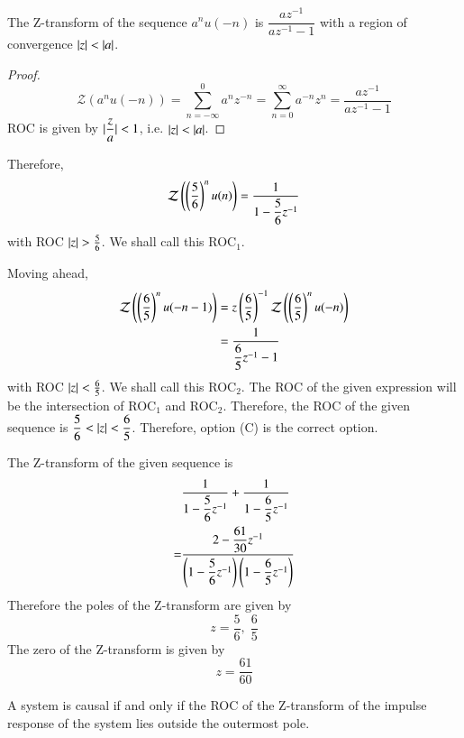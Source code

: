 \documentclass[journal,12pt,twocolumn]{IEEEtran}
\begin{document}
\begin{lemma}
The Z-transform of the sequence $a^nu(-n)$ is $\dfrac{az^{-1}}{az^{-1}-1}$ with a region of convergence $\vert z\vert < \vert a\vert$.
\end{lemma}
\begin{proof}
\begin{equation}
    \mathcal{Z}(a^nu(-n)) = \sum_{n=-\infty}^{0}a^nz^{-n} = \sum_{n=0}^{\infty}a^{-n}z^{n} = \dfrac{az^{-1}}{az^{-1}-1}
\end{equation}
ROC is given by $\vert\dfrac{z}{a}\vert < 1$, i.e. $\vert z\vert < \vert a\vert$.
\end{proof}
Therefore,
\begin{equation}
    \mathcal{Z}\left(\left(\dfrac{5}{6}\right)^nu(n)\right) = \dfrac{1}{1-\dfrac{5}{6}z^{-1}}
\end{equation}
with ROC $\vert z\vert > \frac{5}{6}$. We shall call this ROC$_1$.

Moving ahead,
\begin{align}
    \mathcal{Z}\left(\left(\dfrac{6}{5}\right)^nu(-n-1)\right) &= z\left(\dfrac{6}{5}\right)^{-1}\mathcal{Z}\left(\left(\dfrac{6}{5}\right)^nu(-n)\right)\\
    &= \dfrac{1}{\dfrac{6}{5}z^{-1}-1}
\end{align}
with ROC $\vert z\vert < \frac{6}{5}$. We shall call this ROC$_2$. The ROC of the given expression will be the intersection of ROC$_1$ and ROC$_2$. Therefore, the ROC of the given sequence is $\dfrac{5}{6} < \vert z\vert < \dfrac{6}{5}$. Therefore, option (C) is the correct option.

The Z-transform of the given sequence is 
\begin{align}
&\dfrac{1}{1-\dfrac{5}{6}z^{-1}}+\dfrac{1}{1-\dfrac{6}{5}z^{-1}}\label{z}\\ 
= &\dfrac{2-\dfrac{61}{30}z^{-1}}{\left(1-\dfrac{5}{6}z^{-1}\right)\left(1-\dfrac{6}{5}z^{-1}\right)}
\end{align}
Therefore the poles of the Z-transform are given by 
\begin{equation}
    z = \dfrac{5}{6},\; \dfrac{6}{5}
\end{equation}
The zero of the Z-transform is given by 
\begin{equation}
    z = \dfrac{61}{60}
\end{equation}

\begin{lemma}
A system is causal if and only if the ROC of the Z-transform of the impulse response of the system lies outside the outermost pole.
\label{causility}
\end{lemma}
\end{document}
